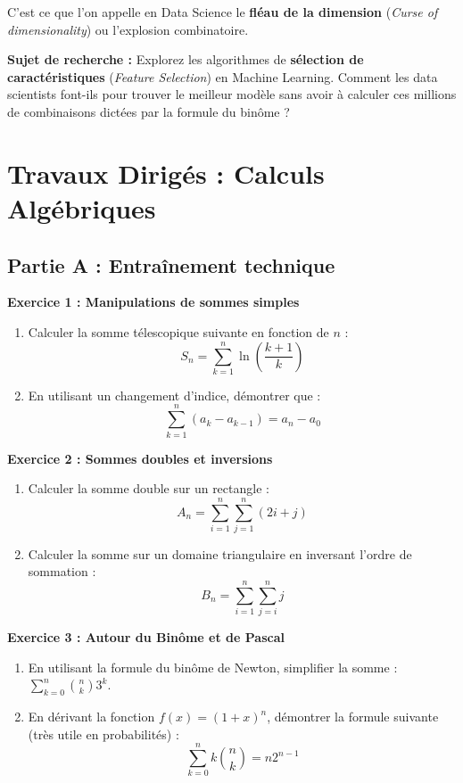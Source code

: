 \documentclass[12pt,a4paper]{report}
\begin{document}
C'est ce que l'on appelle en Data Science le \textbf{fléau de la dimension} (\textit{Curse of dimensionality}) ou l'explosion combinatoire. 

\textbf{Sujet de recherche :} Explorez les algorithmes de \textbf{sélection de caractéristiques} (\textit{Feature Selection}) en Machine Learning. Comment les data scientists font-ils pour trouver le meilleur modèle sans avoir à calculer ces millions de combinaisons dictées par la formule du binôme ?


\chapter*{Travaux Dirigés : Calculs Algébriques}

\section*{Partie A : Entraînement technique}

\textbf{Exercice 1 : Manipulations de sommes simples}
\begin{enumerate}
    \item Calculer la somme télescopique suivante en fonction de $n$ : 
    $$ S_n = \sum_{k=1}^{n} \ln\left(\frac{k+1}{k}\right) $$
    \item En utilisant un changement d'indice, démontrer que :
    $$ \sum_{k=1}^{n} (a_k - a_{k-1}) = a_n - a_0 $$
\end{enumerate}

\textbf{Exercice 2 : Sommes doubles et inversions}
\begin{enumerate}
    \item Calculer la somme double sur un rectangle :
    $$ A_n = \sum_{i=1}^{n} \sum_{j=1}^{n} (2i + j) $$
    \item Calculer la somme sur un domaine triangulaire en inversant l'ordre de sommation :
    $$ B_n = \sum_{i=1}^{n} \sum_{j=i}^{n} j $$
\end{enumerate}

\textbf{Exercice 3 : Autour du Binôme et de Pascal}
\begin{enumerate}
    \item En utilisant la formule du binôme de Newton, simplifier la somme : $ \sum_{k=0}^{n} \binom{n}{k} 3^k $.
    \item En dérivant la fonction $f(x) = (1+x)^n$, démontrer la formule suivante (très utile en probabilités) :
    $$ \sum_{k=0}^{n} k \binom{n}{k} = n 2^{n-1} $$
\end{enumerate}
\end{document}
